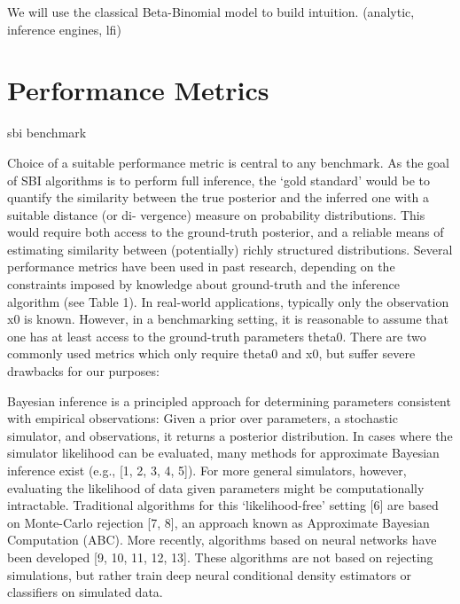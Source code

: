 We will use the classical Beta-Binomial model to build intuition. (analytic, inference engines, lfi)
 

\section{Performance Metrics}

sbi benchmark 



Choice of a suitable performance metric is central to any benchmark. As the goal of SBI algorithms is to perform full inference, the ‘gold standard’ would be to quantify the similarity between the true posterior and the inferred one with a suitable distance (or di- vergence) measure on probability distributions. This would require both access to the ground-truth posterior, and a reliable means of estimating similarity between (potentially) richly structured distributions. Several performance metrics have been used in past research, depending on the constraints imposed by knowledge about ground-truth and the inference algorithm (see Table 1). In real-world applications, typically only the observation x0 is known. However, in a benchmarking setting, it is reasonable to assume that one has at least access to the ground-truth parameters theta0. There are two commonly used metrics which only require theta0 and
x0, but suffer severe drawbacks for our purposes:


Bayesian inference is a principled approach for determining parameters consistent with empirical observations: Given a prior over parameters, a stochastic simulator, and observations, it returns a posterior distribution. In cases where the simulator likelihood can be evaluated, many methods for approximate Bayesian
inference exist (e.g., [1, 2, 3, 4, 5]). For more general simulators, however, evaluating the likelihood of data
given parameters might be computationally intractable. Traditional algorithms for this ‘likelihood-free’
setting [6] are based on Monte-Carlo rejection [7, 8], an approach known as Approximate Bayesian Computation (ABC). More recently, algorithms based on neural networks have been developed [9, 10, 11, 12, 13].
These algorithms are not based on rejecting simulations, but rather train deep neural conditional density estimators or classifiers on simulated data. 


